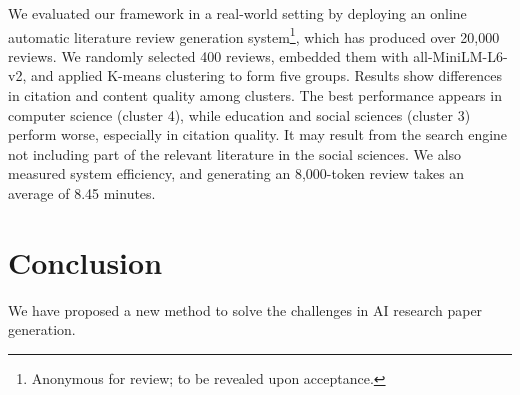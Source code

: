 \documentclass[manuscript,review,anonymous]{acmart}
\begin{document}
We evaluated our framework in a real-world setting by deploying an online automatic literature review generation system\footnote{Anonymous for review; to be revealed upon acceptance.}, which has produced over 20,000 reviews. We randomly selected 400 reviews, embedded them with all-MiniLM-L6-v2, and applied K-means clustering to form five groups. Results show differences in citation and content quality among clusters. The best performance appears in computer science (cluster 4), while education and social sciences (cluster 3) perform worse, especially in citation quality. It may result from the search engine not including part of the relevant literature in the social sciences. We also measured system efficiency, and generating an 8,000-token review takes an average of 8.45 minutes.

\section{Conclusion}

We have proposed a new method to solve the challenges in AI research paper generation.



\end{document}
